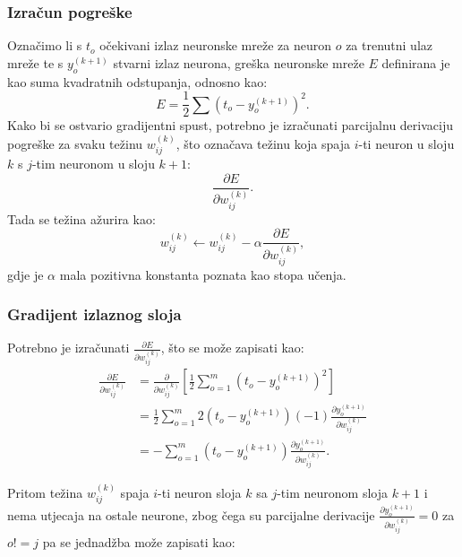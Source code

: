 \documentclass[times, utf8, zavrsni, numeric]{fer}
\begin{document}
\subsubsection{Izračun pogreške}
Označimo li s $t_o$ očekivani izlaz neuronske mreže za neuron $o$ za trenutni ulaz mreže te s $y_o^{(k + 1)}$ stvarni izlaz neurona, greška neuronske mreže $E$ definirana je kao suma kvadratnih odstupanja, odnosno kao:
\[
    E = \frac{1}{2}\sum(t_o-y_o^{(k + 1)})^2.
\]
Kako bi se ostvario gradijentni spust, potrebno je izračunati parcijalnu derivaciju pogreške za svaku težinu $w_{ij}^{(k)}$, što označava težinu koja spaja $i$-ti neuron u sloju $k$ s $j$-tim neuronom u sloju $k+1$:
\[
    \frac{\partial E}{\partial w_{ij}^{(k)}}.
\]
Tada se težina ažurira kao:
\[
    w_{ij}^{(k)} \leftarrow w_{ij}^{(k)} - \alpha \frac{\partial E}{\partial w_{ij}^{(k)}},
\]
gdje je $\alpha$ mala pozitivna konstanta poznata kao stopa učenja.

\subsubsection{Gradijent izlaznog sloja}
Potrebno je izračunati $\frac{\partial E}{\partial w_{ij}^{(k)}}$, što se može zapisati kao:
\begin{equation*}
\begin{split}
    \frac{\partial E}{\partial w_{ij}^{(k)}}
        & = \frac{\partial}{\partial w_{ij}^{(k)}} 
        \left[\frac{1}{2}\displaystyle\sum_{o = 1}^m(t_o - y_o^{(k + 1)})^2\right]\\
        & = \frac{1}{2} \displaystyle\sum_{o = 1}^m2(t_o - y_o^{(k + 1)})(-1) \frac{\partial y_o^{(k + 1)}}{\partial w_{ij}^{(k)}} \\
        & = -\displaystyle\sum_{o = 1}^m(t_o - y_o^{(k + 1)})\frac{\partial y_o^{(k + 1)}}{\partial w_{ij}^{(k)}}.
\end{split}
\end{equation*}

Pritom težina $w_{ij}^{(k)}$ spaja $i$-ti neuron sloja $k$ sa $j$-tim neuronom sloja $k+1$ i nema utjecaja na ostale neurone, zbog čega su parcijalne derivacije $\frac{\partial y_o^{(k + 1)}}{\partial w_{ij}^{(k)}} = 0$ za $o != j$ pa se jednadžba može zapisati kao:
\end{document}
